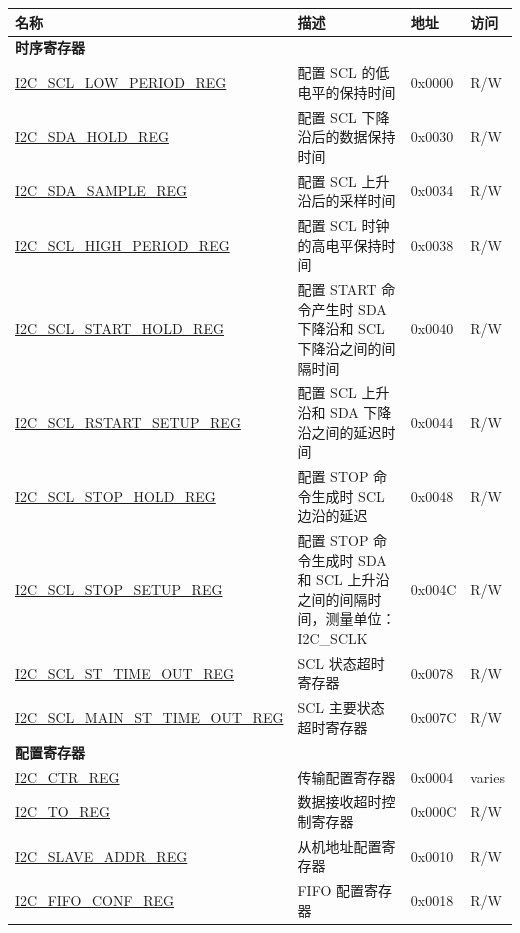 \begin{longtable}{ | p{6cm} | p{7cm} | p{1.3cm} | p{1cm} | }
\hline\rowcolor{lightgray}
名称 & 描述 &  地址 & 访问 \\ \hline
\endhead
\multicolumn{4}{|l|}{\textbf{时序寄存器}} \\ \hline
\hyperref[regdesc:I2CSCLLOWPERIODREG]{I2C\_SCL\_LOW\_PERIOD\_REG} & 配置 SCL 的低电平的保持时间 & 0x0000 & R/W \\ \hline
\hyperref[regdesc:I2CSDAHOLDREG]{I2C\_SDA\_HOLD\_REG} & 配置 SCL 下降沿后的数据保持时间 & 0x0030 & R/W \\ \hline
\hyperref[regdesc:I2CSDASAMPLEREG]{I2C\_SDA\_SAMPLE\_REG} & 配置 SCL 上升沿后的采样时间 & 0x0034 & R/W \\ \hline
\hyperref[regdesc:I2CSCLHIGHPERIODREG]{I2C\_SCL\_HIGH\_PERIOD\_REG} & 配置 SCL 时钟的高电平保持时间 & 0x0038 & R/W \\ \hline
\hyperref[regdesc:I2CSCLSTARTHOLDREG]{I2C\_SCL\_START\_HOLD\_REG} & 配置 START 命令产生时 SDA 下降沿和 SCL 下降沿之间的间隔时间 & 0x0040 & R/W \\ \hline
\hyperref[regdesc:I2CSCLRSTARTSETUPREG]{I2C\_SCL\_RSTART\_SETUP\_REG} & 配置 SCL 上升沿和 SDA 下降沿之间的延迟时间 & 0x0044 & R/W \\ \hline
\hyperref[regdesc:I2CSCLSTOPHOLDREG]{I2C\_SCL\_STOP\_HOLD\_REG} & 配置 STOP 命令生成时 SCL 边沿的延迟 & 0x0048 & R/W \\ \hline
\hyperref[regdesc:I2CSCLSTOPSETUPREG]{I2C\_SCL\_STOP\_SETUP\_REG} & 配置 STOP 命令生成时 SDA 和 SCL 上升沿之间的间隔时间，测量单位：I2C\_SCLK & 0x004C & R/W \\ \hline
\hyperref[regdesc:I2CSCLSTTIMEOUTREG]{I2C\_SCL\_ST\_TIME\_OUT\_REG} & SCL 状态超时寄存器 & 0x0078 & R/W \\ \hline
\hyperref[regdesc:I2CSCLMAINSTTIMEOUTREG]{I2C\_SCL\_MAIN\_ST\_TIME\_OUT\_REG} & SCL 主要状态超时寄存器 & 0x007C & R/W \\ \hline
\multicolumn{4}{|l|}{\textbf{配置寄存器}} \\ \hline
\hyperref[regdesc:I2CCTRREG]{I2C\_CTR\_REG} & 传输配置寄存器 & 0x0004 & varies \\ \hline
\hyperref[regdesc:I2CTOREG]{I2C\_TO\_REG} & 数据接收超时控制寄存器 & 0x000C & R/W \\ \hline
\hyperref[regdesc:I2CSLAVEADDRREG]{I2C\_SLAVE\_ADDR\_REG} & 从机地址配置寄存器 & 0x0010 & R/W \\ \hline
\hyperref[regdesc:I2CFIFOCONFREG]{I2C\_FIFO\_CONF\_REG} & FIFO 配置寄存器 & 0x0018 & R/W \\ \hline

\end{longtable}
